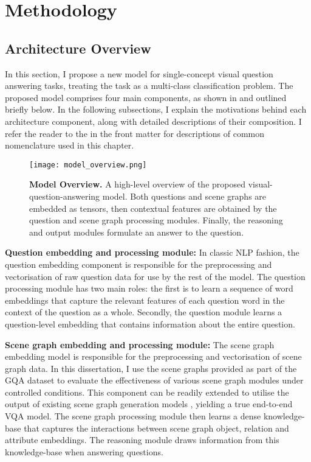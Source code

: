 \chapter{Methodology}
\label{chapter:methodology}

\section{Architecture Overview}
\label{section:architecture_overview}

In this section, I propose a new model for single-concept visual question answering tasks, treating the task as a multi-class classification problem. The proposed model comprises four main components, as shown in \figureautorefname{ \ref{fig:model_overview}} and outlined briefly below. In the following subsections, I explain the motivations behind each architecture component, along with detailed descriptions of their composition. I refer the reader to the  in the front matter for descriptions of common nomenclature used in this chapter.


\begin{figure}[htbp]
    \centering
    \texttt{[image: model\_overview.png]}
    \caption[An overview of the proposed visual-question-answering model.]{\textbf{Model Overview.} A high-level overview of the proposed visual-question-answering model. Both questions and scene graphs are embedded as tensors, then contextual features are obtained by the question and scene graph processing modules. Finally, the reasoning and output modules formulate an answer to the question.}
    \label{fig:model_overview}
\end{figure}

\textbf{Question embedding and processing module:} In classic NLP fashion, the question embedding component is responsible for the preprocessing and vectorisation of raw question data for use by the rest of the model. The question processing module has two main roles: the first is to learn a sequence of word embeddings that capture the relevant features of each question word in the context of the question as a whole. Secondly, the question module learns a question-level embedding that contains information about the entire question.

\textbf{Scene graph embedding and processing module:} The scene graph embedding model is responsible for the preprocessing and vectorisation of scene graph data. In this dissertation, I use the scene graphs provided as part of the GQA dataset to evaluate the effectiveness of various scene graph modules under controlled conditions. This component can be readily extended to utilise the output of existing scene graph generation models \cite{yang2018graph, li2019relation}, yielding a true end-to-end VQA model. The scene graph processing module then learns a dense knowledge-base that captures the interactions between scene graph object, relation and attribute embeddings. The reasoning module draws information from this knowledge-base when answering questions.

